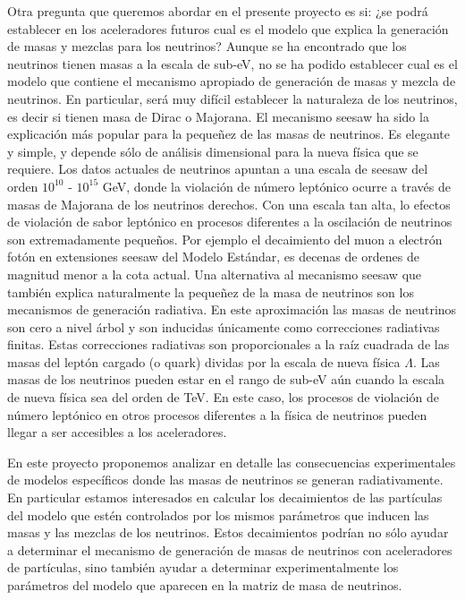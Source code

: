 Otra pregunta que queremos abordar en el presente proyecto es si: 
¿se podrá establecer en los aceleradores futuros cual es el modelo que
explica la generación de masas y mezclas para los neutrinos? Aunque se ha encontrado que los neutrinos tienen masas a la escala de
sub-eV, no se ha podido establecer cual es el modelo que contiene
el mecanismo apropiado de generación de masas y mezcla de neutrinos.
En particular, será muy difícil establecer la naturaleza de los
neutrinos, es decir si tienen masa de Dirac o Majorana. El mecanismo seesaw %
ha sido la
explicación más popular para la pequeñez de las masas de neutrinos. Es
elegante y simple, y depende sólo de análisis dimensional para la
nueva física que se requiere. Los datos actuales de neutrinos
apuntan a una escala de seesaw del orden $10^{10}$ - $10^{15}$ GeV,
donde la violación de número leptónico ocurre a través de masas de
Majorana de los neutrinos derechos. Con una escala tan alta, lo
efectos de violación de sabor leptónico en procesos diferentes a la
oscilación de neutrinos son extremadamente pequeños. Por ejemplo el
decaimiento del muon a electrón fotón en extensiones seesaw del Modelo
Estándar, es decenas de ordenes de magnitud menor a la cota actual. Una alternativa al mecanismo seesaw que también explica naturalmente
la pequeñez de la masa de neutrinos son los mecanismos de generación
radiativa.
En este aproximación las masas de neutrinos son cero a nivel árbol y
son inducidas únicamente como correcciones radiativas finitas. Estas
correcciones radiativas son proporcionales a la raíz cuadrada de
las masas del leptón cargado (o quark) dividas por la escala de nueva
física $\Lambda$. Las masas de los neutrinos pueden estar en el rango
de sub-eV aún cuando la escala de nueva física sea del orden de
TeV. En este caso, los procesos de violación de número leptónico en
otros procesos diferentes a la física de neutrinos pueden llegar
a ser accesibles a los aceleradores.

En este proyecto proponemos analizar en detalle las consecuencias
experimentales de modelos específicos donde las masas de
neutrinos se generan radiativamente. En particular estamos interesados
en calcular los decaimientos de las partículas del modelo que
estén controlados por los mismos parámetros que inducen las masas y
las mezclas de los neutrinos. Estos decaimientos podrían no sólo
ayudar a determinar el mecanismo de generación de masas de neutrinos
con aceleradores de partículas, sino también ayudar a determinar
experimentalmente los parámetros del modelo que aparecen en la matriz
de masa de neutrinos.

